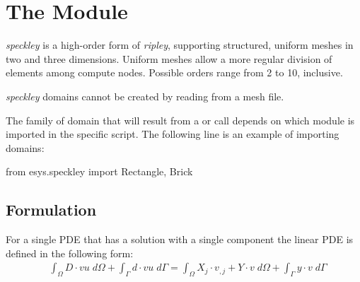 
%
%
%

\chapter{The \speckley Module}\label{CHAPTER ON SPECKLEY}

{\it speckley} is a high-order form of {\it ripley}, supporting structured, 
uniform meshes in two and three dimensions. Uniform meshes allow a more regular 
division of elements among compute nodes. Possible orders range from 2 to 10,
inclusive.

{\it speckley} domains cannot be created by reading from a mesh file.

The family of domain that will result from a 
 or  call depends on which module is imported in
the specific script. The following line is an example of importing 
\speckley domains:

\begin{python}
 from esys.speckley import Rectangle, Brick
\end{python}

\section{Formulation}
For a single PDE that has a solution with a single component the linear PDE is
defined in the following form:
\begin{equation}\label{SPECKLEY.SINGLE.1}
\begin{array}{cl} &
\displaystyle{
\int_{\Omega}
D \cdot vu \; d\Omega } + \int_{\Gamma} d \cdot vu \; d{\Gamma}

= \displaystyle{\int_{\Omega}  X_{j} \cdot v_{,j}+ Y \cdot v \; d\Omega }
+ \displaystyle{\int_{\Gamma} y \cdot v \; d{\Gamma}}
\end{array}
\end{equation}

